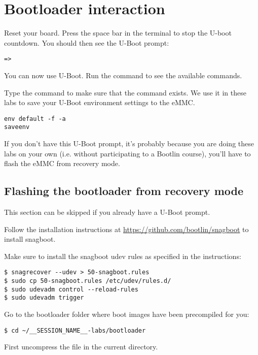 \section{Bootloader interaction}

Reset your board. Press the space bar in the
 terminal to stop the U-boot countdown. You should then see the
U-Boot prompt:

\begin{verbatim}
=>
\end{verbatim}

You can now use U-Boot. Run the  command to see the available
commands.

Type the  command to make sure that the
 command exists. We use it in these labs to
save your U-Boot environment settings to the eMMC.

\begin{verbatim}
env default -f -a
saveenv
\end{verbatim}

If you don't have this U-Boot prompt, it's probably because you are doing these labs on your own
(i.e. without participating to a Bootlin course), you'll have to flash the eMMC
from recovery mode.

\subsection{Flashing the bootloader from recovery mode}

This section can be skipped if you already have a U-Boot prompt.

Follow the installation instructions at
\url{https://github.com/bootlin/snagboot} to install snagboot.

Make sure to install the snagboot udev rules as specified in the instructions:
\begin{verbatim}
$ snagrecover --udev > 50-snagboot.rules
$ sudo cp 50-snagboot.rules /etc/udev/rules.d/
$ sudo udevadm control --reload-rules
$ sudo udevadm trigger
\end{verbatim}

Go to the bootloader folder where boot images have been precompiled for you:

\begin{verbatim}
$ cd ~/__SESSION_NAME__-labs/bootloader
\end{verbatim}

First uncompress the  file in the current directory.


